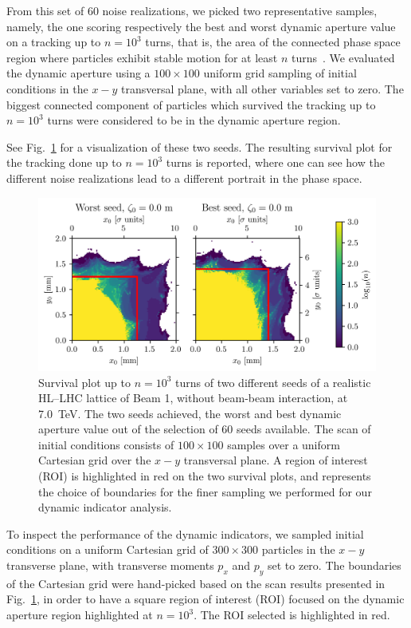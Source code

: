 From this set of 60 noise realizations, we picked two representative samples, namely, the one scoring respectively the best and worst dynamic aperture value on a tracking up to $n=10^3$ turns, that is, the area of the connected phase space region where particles exhibit stable motion for at least $n$ turns~\cite{}. We evaluated the dynamic aperture using a $100\times100$ uniform grid sampling of initial conditions in the $x-y$ transversal plane, with all other variables set to zero. The biggest connected component of particles which survived the tracking up to $n=10^3$ turns were considered to be in the dynamic aperture region.

See Fig.~\ref{fig:seed_presentation} for a visualization of these two seeds. The resulting survival plot for the tracking done up to $n=10^3$ turns is reported, where one can see how the different noise realizations lead to a different portrait in the phase space.

\begin{figure}[htp]
    \centering
    \includegraphics[width=\textwidth]{6_lhc_dynamic_indicators/figs/quick_scan.png}
    \caption{Survival plot up to $n=10^3$ turns of two different seeds of a realistic HL--LHC lattice of Beam 1, without beam-beam interaction, at \SI{7.0}{TeV}. The two seeds achieved, the worst and best dynamic aperture value out of the selection of 60 seeds available. The scan of initial conditions consists of $100\times100$ samples over a uniform Cartesian grid over the $x-y$ transversal plane. A region of interest (ROI) is highlighted in red on the two survival plots, and represents the choice of boundaries for the finer sampling we performed for our dynamic indicator analysis.}
    \label{fig:seed_presentation}
\end{figure}

To inspect the performance of the dynamic indicators, we sampled initial conditions on a uniform Cartesian grid of $300\times300$ particles in the $x-y$ transverse plane, with transverse moments $p_x$ and $p_y$ set to zero. The boundaries of the Cartesian grid were hand-picked based on the scan results presented in Fig.~\ref{fig:seed_presentation}, in order to have a square region of interest (ROI) focused on the dynamic aperture region highlighted at $n=10^3$. The ROI selected is highlighted in red.

